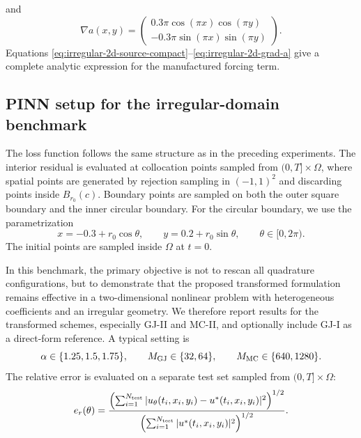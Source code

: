 \documentclass[11pt]{article}
\newcommand{\grad}{\nabla}
\begin{document}
and
\begin{equation}
 \grad a(x,y)
 =
 \begin{pmatrix}
 0.3\pi\cos(\pi x)\cos(\pi y)\\
 -0.3\pi\sin(\pi x)\sin(\pi y)
 \end{pmatrix}.
\label{eq:irregular-2d-grad-a}
\end{equation}
Equations \eqref{eq:irregular-2d-source-compact}--\eqref{eq:irregular-2d-grad-a} give a complete analytic expression for the manufactured forcing term.

\subsection{PINN setup for the irregular-domain benchmark}

The loss function follows the same structure as in the preceding experiments. The interior residual is evaluated at collocation points sampled from $(0,T]\times\Omega$, where spatial points are generated by rejection sampling in $(-1,1)^2$ and discarding points inside $B_{r_0}(c)$. Boundary points are sampled on both the outer square boundary and the inner circular boundary. For the circular boundary, we use the parametrization
\begin{equation}
 x=-0.3+r_0\cos\theta,
 \qquad
 y=0.2+r_0\sin\theta,
 \qquad
 \theta\in[0,2\pi).
\label{eq:irregular-2d-circle-param}
\end{equation}
The initial points are sampled inside $\Omega$ at $t=0$.

In this benchmark, the primary objective is not to rescan all quadrature configurations, but to demonstrate that the proposed transformed formulation remains effective in a two-dimensional nonlinear problem with heterogeneous coefficients and an irregular geometry. We therefore report results for the transformed schemes, especially GJ-II and MC-II, and optionally include GJ-I as a direct-form reference. A typical setting is
\begin{equation}
 \alpha\in\{1.25,1.5,1.75\},
 \qquad
 M_{\rm GJ}\in\{32,64\},
 \qquad
 M_{\rm MC}\in\{640,1280\}.
\label{eq:irregular-2d-parameters}
\end{equation}
The relative error is evaluated on a separate test set sampled from $(0,T]\times\Omega$:
\begin{equation}
 e_r(\theta)
 =
 \frac{
 \left(\sum_{i=1}^{N_{\rm test}}|u_\theta(t_i,x_i,y_i)-u^\ast(t_i,x_i,y_i)|^2\right)^{1/2}
 }{
 \left(\sum_{i=1}^{N_{\rm test}}|u^\ast(t_i,x_i,y_i)|^2\right)^{1/2}
 }.
\label{eq:irregular-2d-relative-error}
\end{equation}
\end{document}
